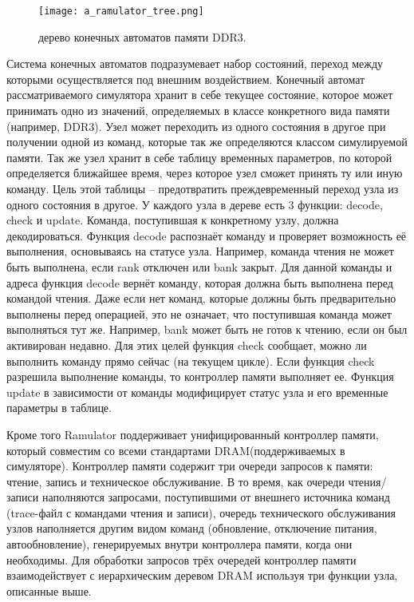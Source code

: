 \begin{figure}[ht]
\centering
  \texttt{[image: a\_ramulator\_tree.png]}  
  \caption{ дерево конечных автоматов памяти DDR3. }
  \label{fig:domain:simulators:ramulator:tree}
\end{figure}

Система конечных автоматов подразумевает набор состояний, переход между которыми осуществляется под внешним воздействием. Конечный автомат рассматриваемого симулятора хранит в себе текущее состояние, которое может принимать одно из значений, определяемых в классе конкретного вида памяти (например, DDR3). Узел может переходить из одного состояния в другое при получении одной из команд, которые так же определяются классом симулируемой памяти. Так же узел хранит в себе таблицу временных параметров, по которой определяется ближайшее время, через которое узел сможет принять ту или иную команду. Цель этой таблицы – предотвратить преждевременный переход узла из одного состояния в другое.  У каждого узла в дереве есть 3 функции: decode, check и update. Команда, поступившая к конкретному узлу, должна декодироваться. Функция decode распознаёт команду и проверяет возможность её выполнения, основываясь на статусе узла. Например, команда чтения не может быть выполнена, если rank отключен или bank закрыт. Для данной команды и адреса функция decode вернёт команду, которая должна быть выполнена перед командой чтения.  Даже если нет команд, которые должны быть предварительно выполнены перед операцией, это не означает, что поступившая команда может выполняться тут же. Например, bank может быть не готов к чтению, если он был активирован недавно. Для этих целей функция check сообщает, можно ли выполнить команду прямо сейчас (на текущем цикле). Если функция check разрешила выполнение команды, то контроллер памяти выполняет ее. Функция update в зависимости от команды модифицирует статус узла и его временные параметры в таблице.

Кроме того Ramulator поддерживает унифицированный контроллер памяти, который совместим со всеми стандартами DRAM(поддерживаемых в симуляторе). Контроллер памяти содержит три очереди запросов к памяти:  чтение, запись и техническое обслуживание. В то время, как очереди чтения/записи наполняются запросами, поступившими от внешнего источника команд (trace-файл с командами чтения и записи), очередь технического обслуживания узлов наполняется другим видом команд (обновление, отключение питания, автообновление), генерируемых внутри контроллера памяти, когда они необходимы. Для обработки запросов трёх очередей контроллер памяти взаимодействует с иерархическим деревом DRAM используя три функции узла, описанные выше.  

